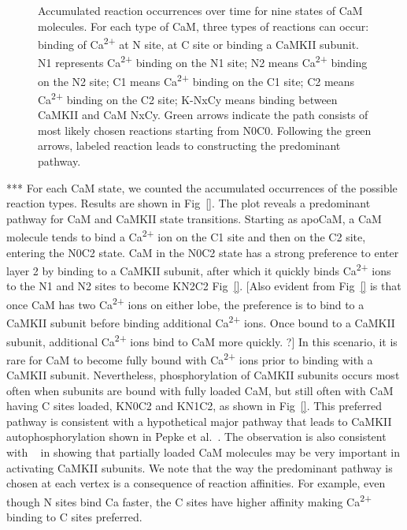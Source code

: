 \documentclass[10pt,letterpaper]{article}
\begin{document}
\begin{figure}[!h]
	\caption{{\bf}
	Accumulated reaction occurrences over time for nine states of CaM molecules. For each type of CaM, three types of reactions can occur: binding of Ca\textsuperscript{2+} at N site, at C site or binding a CaMKII subunit. N1 represents Ca\textsuperscript{2+} binding on the N1 site; N2 means Ca\textsuperscript{2+} binding on the N2 site; C1 means Ca\textsuperscript{2+} binding on the C1 site; C2 means Ca\textsuperscript{2+} binding on the C2 site; K-NxCy means binding between CaMKII and CaM NxCy. Green arrows indicate the path consists of most likely chosen reactions starting from N0C0. Following the green arrows, labeled reaction leads to constructing the predominant pathway.}
\label{fig3}
\end{figure}
***
For each CaM state, we counted the accumulated occurrences of the possible reaction types. Results are shown in Fig~\ref{}. The plot reveals a predominant pathway for CaM and CaMKII state transitions. Starting as apoCaM, a CaM molecule tends to bind a Ca\textsuperscript{2+} ion on the C1 site and then on the C2 site, entering the N0C2 state. CaM in the N0C2 state has a strong preference to enter layer 2 by binding to a CaMKII subunit, after which it quickly binds Ca\textsuperscript{2+} ions to the N1 and N2 sites to become KN2C2 Fig~\ref{}. [Also evident from Fig~\ref{} is that once CaM has two Ca\textsuperscript{2+} ions on either lobe, the preference is to bind to a CaMKII subunit before binding additional Ca\textsuperscript{2+} ions. Once bound to a CaMKII subunit, additional Ca\textsuperscript{2+} ions bind to CaM more quickly. ?] In this scenario, it is rare for CaM to become fully bound with Ca\textsuperscript{2+} ions prior to binding with a CaMKII subunit. Nevertheless, phosphorylation of CaMKII subunits occurs most often when subunits are bound with fully loaded CaM, but still often with CaM having C sites loaded, KN0C2 and KN1C2, as shown in Fig~\ref{}. This preferred pathway is consistent with a hypothetical major pathway that leads to CaMKII autophosphorylation shown in Pepke et al.~\cite{Pepke:2010ju}. The observation is also consistent with ~\cite{} in showing that partially loaded CaM molecules may be very important in activating CaMKII subunits. We note that the way the predominant pathway is chosen at each vertex is a consequence of reaction affinities. For example, even though N sites bind Ca faster, the C sites have higher affinity making Ca\textsuperscript{2+} binding to C sites preferred. 
\end{document}
